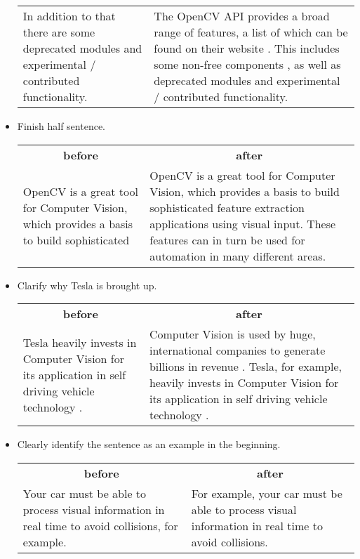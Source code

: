 \documentclass[12pt, a4paper]{article}
\begin{document}
\begin{itemize}
\begin{tabular}{p{.5\linewidth} p{.5\linewidth}}
		In addition to that there are some deprecated modules and experimental / contributed functionality. \cite{openCVRefMan}&
		The OpenCV API provides a broad range of features, a list of which can be found on their website \cite{openCVRefMan}. This includes some non-free components \cite{openCVNonFree}, as well as deprecated modules and experimental / contributed functionality.\\
	\end{tabular}
	\item Finish half sentence.

	\begin{tabular}{p{.5\linewidth} p{.5\linewidth}}
		\multicolumn{1}{c}{\textbf{before}} & \multicolumn{1}{c}{\textbf{after}}\\
		OpenCV is a great tool for Computer Vision, which provides a basis to build sophisticated&
		OpenCV is a great tool for Computer Vision, which provides a basis to build sophisticated feature extraction applications using visual input. These features can in turn be used for automation in many different areas.\\
	\end{tabular}
	\item Clarify why Tesla is brought up.

	\begin{tabular}{p{.5\linewidth} p{.5\linewidth}}
		\multicolumn{1}{c}{\textbf{before}} & \multicolumn{1}{c}{\textbf{after}}\\
		Tesla heavily invests in Computer Vision for its application in self driving vehicle technology \cite{teslaAutopilot} \cite{teslaCVArticle}.&
		Computer Vision is used by huge, international companies to generate billions in revenue \cite{teslaValue}. Tesla, for example, heavily invests in Computer Vision for its application in self driving vehicle technology \cite{teslaAutopilot} \cite{teslaCVArticle}.\\
	\end{tabular}
	\item Clearly identify the sentence as an example in the beginning.

	\begin{tabular}{p{.5\linewidth} p{.5\linewidth}}
		\multicolumn{1}{c}{\textbf{before}} & \multicolumn{1}{c}{\textbf{after}}\\
		Your car must be able to process visual information in real time to avoid collisions, for example.&
		For example, your car must be able to process visual information in real time to avoid collisions.\\
	\end{tabular}
\end{itemize}
\end{document}
